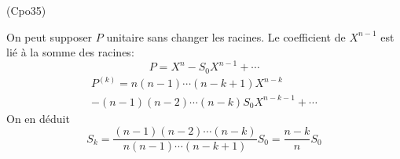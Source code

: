 \begin{tiny}(Cpo35)\end{tiny} On peut supposer $P$ unitaire sans changer les racines. Le coefficient de $X^{n-1}$ est lié à la somme des racines:
\begin{displaymath}
 P = X^n - S_0 X^{n-1}+ \cdots
\end{displaymath}
\begin{multline*}
 P^{(k)} = n(n-1)\cdots(n-k+1)X^{n-k}\\-(n-1)(n-2)\cdots(n-k)S_0X^{n-k-1}+\cdots
\end{multline*}
On en déduit
\begin{displaymath}
 S_k=
\frac{(n-1)(n-2)\cdots(n-k)}{n(n-1)\cdots(n-k+1)}S_0
= \frac{n-k}{n}S_0
\end{displaymath}